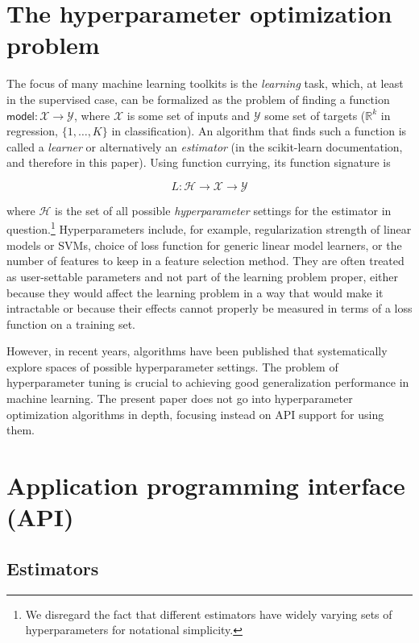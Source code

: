 \documentclass[a4paper,twocolumn]{article}
\begin{document}
\section{The hyperparameter optimization problem}

The focus of many machine learning toolkits is the \textit{learning} task,
which, at least in the supervised case,
can be formalized as the problem of finding a function
$\mathsf{model} : \mathcal{X} \to \mathcal{Y}$,
where $\mathcal{X}$ is some set of inputs
and $\mathcal{Y}$ some set of targets
($\mathbb{R}^k$ in regression, $\{1,\dots,K\}$ in classification).
An algorithm that finds such a function is called a \textit{learner}
or alternatively an \textit{estimator}
(in the scikit-learn documentation, and therefore in this paper).
Using function currying, its function signature is

\[
  L : \mathcal{H} \to \mathcal{X} \to \mathcal{Y}
\]

where $\mathcal{H}$ is the set of all possible \textit{hyperparameter} settings
for the estimator in question.\footnote{
  We disregard the fact that different estimators
  have widely varying sets of hyperparameters for notational simplicity.}
Hyperparameters include, for example,
regularization strength of linear models or SVMs,
choice of loss function for generic linear model learners,
or the number of features to keep in a feature selection method.
They are often treated as user-settable parameters
and not part of the learning problem proper,
either because they would affect the learning problem
in a way that would make it intractable \citep{bergstra2012}
or because their effects cannot properly be measured
in terms of a loss function on a training set.

However, in recent years, algorithms have been published
that systematically explore spaces of possible hyperparameter settings.
The problem of hyperparameter tuning
is crucial to achieving good generalization performance in machine learning.
The present paper does not go into hyperparameter optimization algorithms
in depth, focusing instead on API support for using them.

\section{Application programming interface (API)}

\subsection{Estimators}
\end{document}
